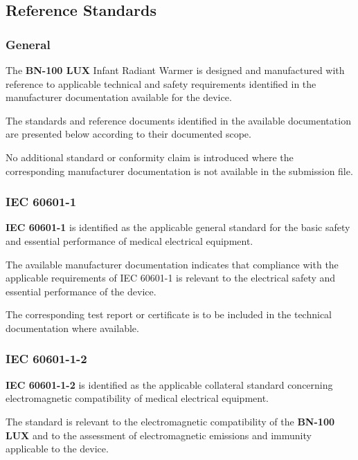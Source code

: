 
\hypertarget{p3-3-5}{}

\subsection{Reference Standards}

\subsubsection{General}

The \textbf{BN-100 LUX} Infant Radiant Warmer is designed and manufactured
with reference to applicable technical and safety requirements identified in
the manufacturer documentation available for the device.

The standards and reference documents identified in the available
documentation are presented below according to their documented scope.

No additional standard or conformity claim is introduced where the
corresponding manufacturer documentation is not available in the submission
file.

\subsubsection{IEC 60601-1}

\textbf{IEC 60601-1} is identified as the applicable general standard for the
basic safety and essential performance of medical electrical equipment.

The available manufacturer documentation indicates that compliance with
the applicable requirements of IEC 60601-1 is relevant to the electrical
safety and essential performance of the device.

The corresponding test report or certificate is to be included in the
technical documentation where available.

\subsubsection{IEC 60601-1-2}

\textbf{IEC 60601-1-2} is identified as the applicable collateral standard
concerning electromagnetic compatibility of medical electrical equipment.

The standard is relevant to the electromagnetic compatibility of the
\textbf{BN-100 LUX} and to the assessment of electromagnetic emissions and
immunity applicable to the device.

